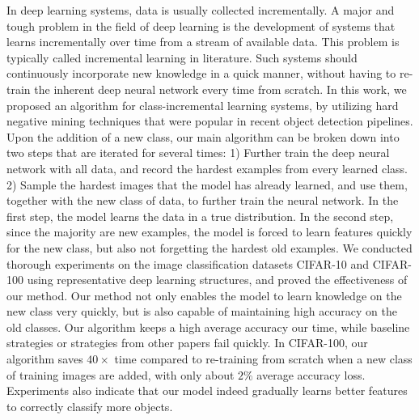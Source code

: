 \begin{englishabstract}

In deep learning systems, data is usually collected incrementally. A major and tough problem in the field of deep learning is the development of systems that learns incrementally over time from a stream of available data. This problem is typically called incremental learning in literature. Such systems should continuously incorporate new knowledge in a quick manner, without having to re-train the inherent deep neural network every time from scratch. In this work, we proposed an algorithm for class-incremental learning systems, by utilizing hard negative mining techniques that were popular in recent object detection pipelines. Upon the addition of a new class, our main algorithm can be broken down into two steps that are iterated for several times: 1) Further train the deep neural network with all data, and record the hardest examples from every learned class. 2) Sample the hardest images that the model has already learned, and use them, together with the new class of data, to further train the neural network. In the first step, the model learns the data in a true distribution. In the second step, since the majority are new examples, the model is forced to learn features quickly for the new class, but also not forgetting the hardest old examples. We conducted thorough experiments on the image classification datasets CIFAR-10 and CIFAR-100 using representative deep learning structures, and proved the effectiveness of our method. Our method not only enables the model to learn knowledge on the new class very quickly, but is also capable of maintaining high accuracy on the old classes. Our algorithm keeps a high average accuracy our time, while baseline strategies or strategies from other papers fail quickly. In CIFAR-100, our algorithm saves $40\times$ time compared to re-training from scratch when a new class of training images are added, with only about $2\%$ average accuracy loss. Experiments also indicate that our model indeed gradually learns better features to correctly classify more objects. 

\end{englishabstract}

